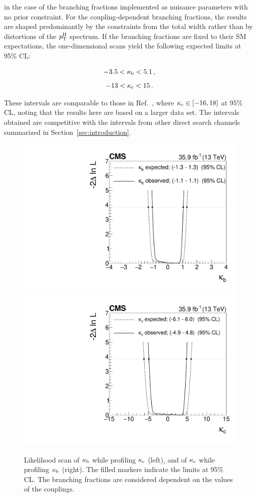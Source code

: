 % 
in the case of the branching fractions implemented as nuisance parameters with no prior constraint.
% 
For the coupling-dependent branching fractions, the results are shaped predominantly by the constraints from the total width rather than by distortions of the $p_\mathrm{T}^\mathrm{H}$ spectrum.
% 
If the branching fractions are fixed to their SM expectations, the one-dimensional scans yield the following expected limits at 95\% CL:
% 
\begin{linenomath*}
\begin{equation}
\label{eq:kappasensitivity_fixedSMBRs}
\begin{array}{c}
-3.5 < \kappa_{\mathrm{b}} < 5.1  \,,
 \\[8pt]
-13 < \kappa_{\mathrm{c}} < 15
\,.
\end{array}
\end{equation}
\end{linenomath*}
% 
These intervals are comparable to those in Ref.~\cite{Bishara:2016jga}, where $\kappa_{\mathrm{c}} \in [ -16, 18 ]$ at 95\% CL, noting that the results here are based on a larger data set.
% 
The intervals obtained are competitive with the intervals from other direct search channels summarized in Section~\ref{sec:introduction}.


\begin{figure}[hbtp]
  \begin{center}
    \includegraphics[width=0.49\linewidth]{img/interpretation/onekappascan_kbkc_couplingdependentBRs_kappab.pdf}
    \includegraphics[width=0.49\linewidth]{img/interpretation/onekappascan_kbkc_couplingdependentBRs_kappac.pdf}
    \caption{
        Likelihood scan of $\kappa_{\mathrm{b}}$ while profiling $\kappa_{\mathrm{c}}$ (left), and of $\kappa_{\mathrm{c}}$ while profiling $\kappa_{\mathrm{b}}$ (right).
        The filled markers indicate the limits at 95\% CL.
        The branching fractions are considered dependent on the values of the couplings.
        }
    \label{fig:scans_kappabkappac_oneDimScans}
  \end{center}
\end{figure}

